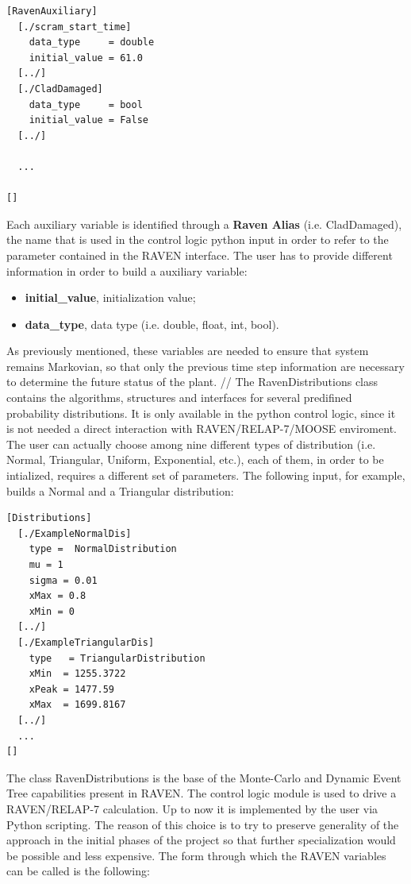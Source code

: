 \documentclass{mc2013}
\begin{document}
\begin{lstlisting}
[RavenAuxiliary]
  [./scram_start_time]
    data_type     = double
    initial_value = 61.0
  [../]
  [./CladDamaged]
    data_type     = bool
    initial_value = False
  [../]
  
  ...

[]
\end{lstlisting}
Each auxiliary variable is identified through a \textbf{Raven Alias} (i.e. CladDamaged), the name that is used in the control logic python input in order to refer to the parameter contained in the RAVEN interface.
The user has to provide different information in order to build a auxiliary variable:
\begin{itemize}
  \item \textbf{initial\_value}, initialization value;
  \item \textbf{data\_type}, data type (i.e. double, float, int, bool).
\end{itemize}
As previously mentioned, these variables are needed to ensure that system remains Markovian, so that only the previous time step information are necessary to determine the future status of the plant. 
// The RavenDistributions class contains the algorithms, structures and interfaces for several predifined probability distributions. It is only available in the python control logic, since it is not needed a direct interaction with RAVEN/RELAP-7/MOOSE enviroment. The user can actually choose among nine different types of distribution (i.e. Normal, Triangular, Uniform, Exponential, etc.), each of them, in order to be intialized, requires a different set of parameters.
The following input, for example, builds a Normal and a Triangular distribution:
\begin{lstlisting}
[Distributions]
  [./ExampleNormalDis]
    type =  NormalDistribution
    mu = 1
    sigma = 0.01
    xMax = 0.8
    xMin = 0
  [../]
  [./ExampleTriangularDis]
    type   = TriangularDistribution
    xMin  = 1255.3722 
    xPeak = 1477.59
    xMax  = 1699.8167 
  [../]
  ...
[]
\end{lstlisting}
The class RavenDistributions is the base of the Monte-Carlo and Dynamic Event Tree capabilities present in RAVEN. 
The control logic module is used to drive a RAVEN/RELAP-7 calculation. Up to now it is implemented by the user via Python scripting. The reason of this choice is to try to preserve generality of the approach in the initial phases of the project so that further specialization would be possible and less expensive.  The form through which the RAVEN variables can be called is the following:
\end{document}
